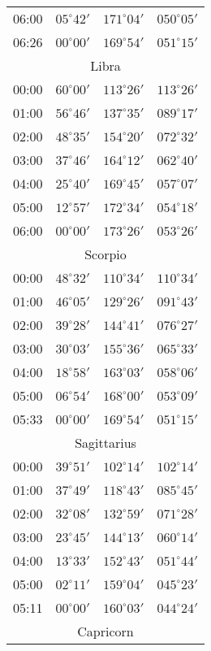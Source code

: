 \begin{table}
\begin{Parallel}{}{}
{{\begin{tabular}{l|lll}
06:00 & $05^\circ 42'$ & $171^\circ 04'$& $050^\circ 05'$ \\
06:26 & $00^\circ 00'$ & $169^\circ 54'$& $051^\circ 15'$ \\
\multicolumn{4}{c}{Libra}\\
00:00 & $60^\circ 00'$ & $113^\circ 26'$& $113^\circ 26'$ \\
01:00 & $56^\circ 46'$ & $137^\circ 35'$& $089^\circ 17'$ \\
02:00 & $48^\circ 35'$ & $154^\circ 20'$& $072^\circ 32'$ \\
03:00 & $37^\circ 46'$ & $164^\circ 12'$& $062^\circ 40'$ \\
04:00 & $25^\circ 40'$ & $169^\circ 45'$& $057^\circ 07'$ \\
05:00 & $12^\circ 57'$ & $172^\circ 34'$& $054^\circ 18'$ \\
06:00 & $00^\circ 00'$ & $173^\circ 26'$& $053^\circ 26'$ \\
\multicolumn{4}{c}{Scorpio}\\
00:00 & $48^\circ 32'$ & $110^\circ 34'$& $110^\circ 34'$ \\
01:00 & $46^\circ 05'$ & $129^\circ 26'$& $091^\circ 43'$ \\
02:00 & $39^\circ 28'$ & $144^\circ 41'$& $076^\circ 27'$ \\
03:00 & $30^\circ 03'$ & $155^\circ 36'$& $065^\circ 33'$ \\
04:00 & $18^\circ 58'$ & $163^\circ 03'$& $058^\circ 06'$ \\
05:00 & $06^\circ 54'$ & $168^\circ 00'$& $053^\circ 09'$ \\
05:33 & $00^\circ 00'$ & $169^\circ 54'$& $051^\circ 15'$ \\
\multicolumn{4}{c}{Sagittarius}\\
00:00 & $39^\circ 51'$ & $102^\circ 14'$& $102^\circ 14'$ \\
01:00 & $37^\circ 49'$ & $118^\circ 43'$& $085^\circ 45'$ \\
02:00 & $32^\circ 08'$ & $132^\circ 59'$& $071^\circ 28'$ \\
03:00 & $23^\circ 45'$ & $144^\circ 13'$& $060^\circ 14'$ \\
04:00 & $13^\circ 33'$ & $152^\circ 43'$& $051^\circ 44'$ \\
05:00 & $02^\circ 11'$ & $159^\circ 04'$& $045^\circ 23'$ \\
05:11 & $00^\circ 00'$ & $160^\circ 03'$& $044^\circ 24'$ \\
\multicolumn{4}{c}{Capricorn}\\

\end{tabular}}}
\end{Parallel}
\end{table}
